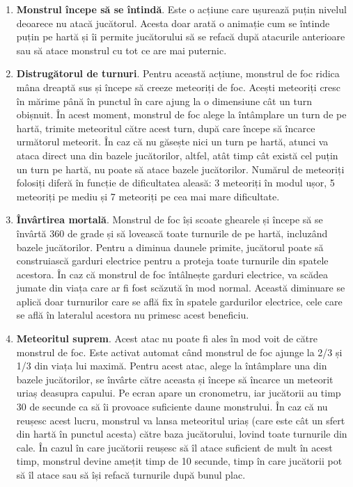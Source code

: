 \documentclass[12pt, a4paper]{article}
\begin{document}
	\begin{enumerate}
		\item \textbf{Monstrul începe să se întindă}. Este o acțiune care ușurează puțin nivelul deoarece nu atacă jucătorul. Acesta doar arată o animație cum se întinde puțin pe hartă și îi permite jucătorului să se refacă după atacurile anterioare sau să atace monstrul cu tot ce are mai puternic.
		\item \textbf{Distrugătorul de turnuri}. Pentru această acțiune, monstrul de foc ridica mâna dreaptă sus și începe să creeze meteoriți de foc. Acești meteoriți cresc în mărime până în punctul în care ajung la o dimensiune cât un turn obișnuit. În acest moment, monstrul de foc alege la întâmplare un turn de pe hartă, trimite meteoritul către acest turn, după care începe să încarce următorul meteorit. În caz că nu găsește nici un turn pe hartă, atunci va ataca direct una din bazele jucătorilor, altfel, atât timp cât există cel puțin un turn pe hartă, nu poate să atace bazele jucătorilor. Numărul de meteoriți folosiți diferă în funcție de dificultatea aleasă: 3 meteoriți în modul ușor, 5 meteoriți pe mediu și 7 meteoriți pe cea mai mare dificultate.
		\item \textbf{Învârtirea mortală}. Monstrul de foc își scoate ghearele și începe să se învârtă 360 de grade și să lovească toate turnurile de pe hartă, incluzând bazele jucătorilor. Pentru a diminua daunele primite, jucătorul poate să construiască garduri electrice pentru a proteja toate turnurile din spatele acestora. În caz că monstrul de foc întâlnește garduri electrice, va scădea jumate din viața care ar fi fost scăzută în mod normal. Această diminuare se aplică doar turnurilor care se află fix în spatele gardurilor electrice, cele care se află în lateralul acestora nu primesc acest beneficiu.
		\item \textbf{Meteoritul suprem}. Acest atac nu poate fi ales în mod voit de către monstrul de foc. Este activat automat când monstrul de foc ajunge la 2/3 și 1/3 din viața lui maximă. Pentru acest atac, alege la întâmplare una din bazele jucătorilor, se învârte către aceasta și începe să încarce un meteorit uriaș deasupra capului. Pe ecran apare un cronometru, iar jucătorii au timp 30 de secunde ca să îi provoace suficiente daune monstrului. În caz că nu reușesc acest lucru, monstrul va lansa meteoritul uriaș (care este cât un sfert din hartă în punctul acesta) către baza jucătorului, lovind toate turnurile din cale. În cazul în care jucătorii reușesc să îl atace suficient de mult în acest timp, monstrul devine amețit timp de 10 secunde, timp în care jucătorii pot să îl atace sau să își refacă turnurile după bunul plac.
	\end{enumerate}
	
\end{document}
